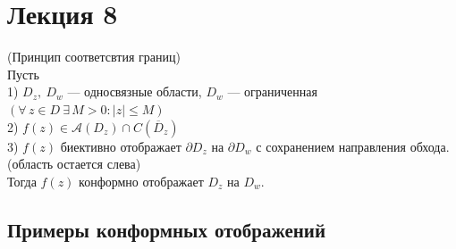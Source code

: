 	\newpage
	\section{Лекция 8}
	
	\begin{theorem*} 
		(Принцип соответсвтия границ)\\ \indent 
		Пусть \\
		1) $ D_z,\ D_w $ --- односвязные области, $ D_w$ --- ограниченная $(\forall\, z \in D \ \exists\, M > 0 : |z| \leqslant M)$\\
		2) $ f(z) \in \mathcal A(D_z)\cap C(\overline D_z) $ \\
		3) $ f(z)$ биективно отображает $ \partial D_z \text{ на } \partial D_w$ с сохранением направления обхода.\\(область остается слева)\\
		Тогда $ f(z) $ конформно отображает $ D_z $ на $ D_w $.
	\end{theorem*}
	
	\subsection{Примеры конформных отображений}
	
